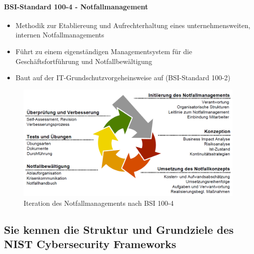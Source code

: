 \documentclass[10pt,a4paper]{article}
\begin{document}
\paragraph*{BSI-Standard 100-4 - Notfallmanagement}
\begin{itemize}[noitemsep,topsep=0pt,leftmargin=*]
    \item Methodik zur Etabliereung und Aufrechterhaltung eines unternehmensweiten, internen Notfallmanagements
    \item Führt zu einem eigenständigen Managementsystem für die Geschäftsfortführung und Notfallbewältigung
    \item Baut auf der IT-Grundschutzvorgeheinsweise auf (BSI-Standard 100-2)
\end{itemize}
\begin{figure}[H]
    \begin{center}
    \includegraphics[width=16cm]{images/vortraggrundschutz.png}
    \caption{Iteration des Notfallmanagements nach BSI 100-4 \cite{münch2009}}
    \label{bsi100-4}
    \end{center}
\end{figure}

\subsection*{Sie kennen die Struktur und Grundziele des NIST Cybersecurity Frameworks}
\end{document}
